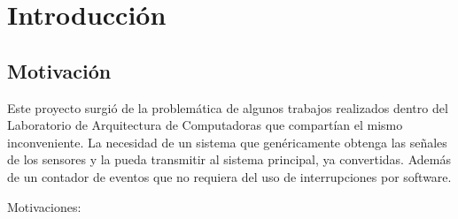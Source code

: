 \chapter{Introducción} %
\label{cha:introduccion}

\section{Motivación} %
\label{sec:motivacion}

Este proyecto surgió de la problemática de algunos trabajos realizados dentro del Laboratorio de Arquitectura de Computadoras que compartían el mismo inconveniente. La necesidad de un sistema que genéricamente obtenga las señales de los sensores y la pueda transmitir al sistema principal, ya convertidas. Además de un contador de eventos que no requiera del uso de interrupciones por software.

Motivaciones: 

